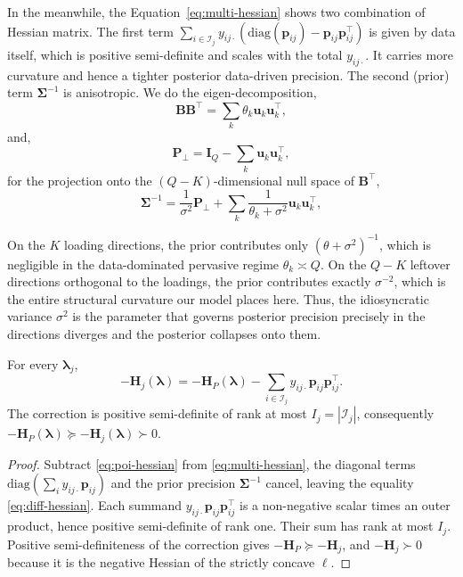 In the meanwhile, the Equation~\eqref{eq:multi-hessian} shows two combination of Hessian matrix. The first term $\sum_{i\in\mathcal{I}_{j}}y_{ij\cdot}\left(\text{diag}(\bm{p}_{ij})-\bm{p}_{ij}\bm{p}_{ij}^{\top}\right)$ is given by data itself, which is positive semi-definite and scales with the total $y_{ij\cdot}$. It carries more curvature and hence a tighter posterior data-driven precision. The second (prior) term $\bm{\Sigma}^{-1}$ is anisotropic. We do the eigen-decomposition,
\begin{equation}
    \mathbf{BB}^{\top}=\sum_{k}\theta_{k}\mathbf{u}_{k}\mathbf{u}_{k}^{\top},
    \label{eq:eigen-decomp1}
\end{equation}
and,
\begin{equation}
    \mathbf{P}_{\perp}=\mathbf{I}_{Q}-\sum_{k}\mathbf{u}_{k}\mathbf{u}_{k}^{\top},
    \label{eq:eigen-decomp2}
\end{equation}
for the projection onto the $(Q-K)$-dimensional null space of $\mathbf{B}^{\top}$,
\begin{equation}
    \bm{\Sigma}^{-1}=\dfrac{1}{\sigma^2}\mathbf{P}_{\perp}+\sum_{k}\frac{1}{\theta_{k}+\sigma^{2}}\mathbf{u}_{k}\mathbf{u}_{k}^{\top},
    \label{eq:null-space-decomp}
\end{equation}

On the $K$ loading directions, the prior contributes only $\left(\theta+\sigma^2\right)^{-1}$, which is negligible in the data-dominated pervasive regime $\theta_{k}\asymp Q$. On the $Q-K$ leftover directions orthogonal to the loadings, the prior contributes exactly $\sigma^{-2}$, which is the entire structural curvature our model places here. Thus, the idiosyncratic variance $\sigma^{2}$ is the parameter that governs posterior precision precisely in the directions diverges and the posterior collapses onto them.

\begin{proposition}
    For every $\bm{\lambda}_{j}$,
    \begin{equation}
        -\mathbf{H}_{j}(\bm{\lambda})=-\mathbf{H}_{P}(\bm{\lambda})-\sum_{i\in \mathcal{I}_{j}}y_{ij\cdot} \bm{p}_{ij}\bm{p}_{ij}^{\top}.
        \label{eq:diff-hessian}
    \end{equation}
    The correction is positive semi-definite of rank at most $I_{j}=|\mathcal{I}_{j}|$, consequently $-\mathbf{H}_{P}(\bm{\lambda})\succeq -\mathbf{H}_{j}(\bm{\lambda})\succ 0$.
    \label{prop:diff-s}
\end{proposition}

\begin{proof}
    Subtract \eqref{eq:poi-hessian} from \eqref{eq:multi-hessian}, the diagonal terms $\text{diag}\left(\sum_{i}y_{ij\cdot}\bm{p}_{ij}\right)$ and the prior precision $\bm{\Sigma}^{-1}$ cancel, leaving the equality \eqref{eq:diff-hessian}. Each summand $y_{ij\cdot}\bm{p}_{ij}\bm{p}_{ij}^{\top}$ is a non-negative scalar times an outer product, hence positive semi-definite of rank one. Their sum has rank at most $I_{j}$. Positive semi-definiteness of the correction gives $-\mathbf{H}_{P}\succeq -\mathbf{H}_{j}$, and $-\mathbf{H}_{j}\succ 0$ because it is the negative Hessian of the strictly concave $\ell$. 
\end{proof}

